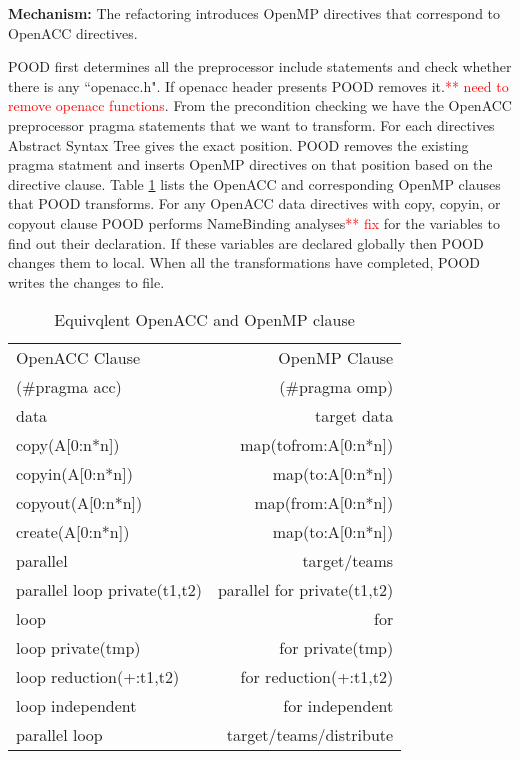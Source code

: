 \documentclass{sig-alternate-05-2015}
\newcommand\todo[1]{\textcolor{red}{** #1}}
\begin{document}
\textbf{Mechanism:} The refactoring introduces OpenMP directives that correspond to OpenACC directives.

POOD first determines all the preprocessor include statements and check whether there is any ``openacc.h". If openacc header presents POOD removes it.\todo{need to remove openacc functions}. From the precondition checking we have the OpenACC preprocessor pragma statements that we want to transform. For each directives Abstract Syntax Tree gives the exact position. POOD removes the existing pragma statment and inserts OpenMP directives on that position based on the directive clause. Table \ref{table:1} lists the OpenACC and corresponding OpenMP clauses that POOD transforms. For any OpenACC data directives with copy, copyin, or copyout clause POOD performs NameBinding analyses\todo{fix} for the variables to find out their declaration. If these variables are declared globally then POOD changes them to local. When all the transformations have completed, POOD writes the changes to file.


\begin{table}[t]
	\begin{minipage}{0.47\textwidth}
\caption{Equivqlent OpenACC and OpenMP clause}
\centering
\begin{tabular}{ | l@{\hspace{0.1cm}}|  @{\hspace{0.4cm}}r@{\hspace{0.1cm}}|} 
 \hline
 \hspace*{0.4cm} OpenACC Clause & OpenMP Clause\hspace*{0.6cm}\\
 \hspace*{0.5cm} (\#pragma acc)%
  & (\#pragma omp)\hspace*{0.6cm} \\
 \hline
 data & target data \\ 
 copy(A[0:n*n]) & map(tofrom:A[0:n*n]) \\
 copyin(A[0:n*n]) & map(to:A[0:n*n]) \\
 copyout(A[0:n*n]) & map(from:A[0:n*n]) \\
 create(A[0:n*n]) & map(to:A[0:n*n]) \\ 
 parallel & target/teams \\ 
 parallel loop private(t1,t2) & parallel for private(t1,t2) \\
 loop & for \\
 loop private(tmp) & for private(tmp) \\
 loop reduction(+:t1,t2) & for reduction(+:t1,t2) \\
 loop independent & for independent \\
 parallel loop & target/teams/distribute \\
 \hline
\end{tabular}

\label{table:1}
\end{minipage}
\end{table}
\end{document}
